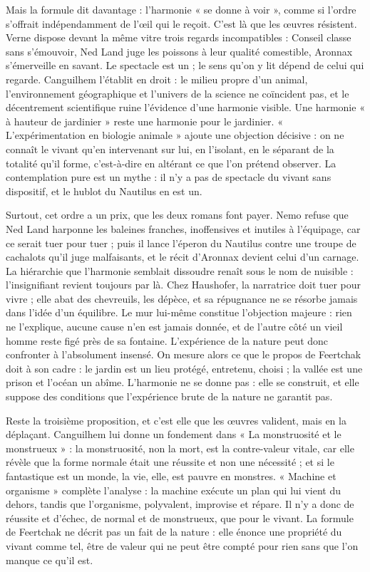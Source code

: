 \documentclass[11pt,a4paper]{article}
\begin{document}
Mais la formule dit davantage : l'harmonie « se donne à voir », comme si l'ordre s'offrait indépendamment de l'œil qui le reçoit. C'est là que les œuvres résistent. Verne dispose devant la même vitre trois regards incompatibles : Conseil classe sans s'émouvoir, Ned Land juge les poissons à leur qualité comestible, Aronnax s'émerveille en savant. Le spectacle est un ; le sens qu'on y lit dépend de celui qui regarde. Canguilhem l'établit en droit : le milieu propre d'un animal, l'environnement géographique et l'univers de la science ne coïncident pas, et le décentrement scientifique ruine l'évidence d'une harmonie visible. Une harmonie « à hauteur de jardinier » reste une harmonie pour le jardinier. « L'expérimentation en biologie animale » ajoute une objection décisive : on ne connaît le vivant qu'en intervenant sur lui, en l'isolant, en le séparant de la totalité qu'il forme, c'est-à-dire en altérant ce que l'on prétend observer. La contemplation pure est un mythe : il n'y a pas de spectacle du vivant sans dispositif, et le hublot du Nautilus en est un.

Surtout, cet ordre a un prix, que les deux romans font payer. Nemo refuse que Ned Land harponne les baleines franches, inoffensives et inutiles à l'équipage, car ce serait tuer pour tuer ; puis il lance l'éperon du Nautilus contre une troupe de cachalots qu'il juge malfaisants, et le récit d'Aronnax devient celui d'un carnage. La hiérarchie que l'harmonie semblait dissoudre renaît sous le nom de nuisible : l'insignifiant revient toujours par là. Chez Haushofer, la narratrice doit tuer pour vivre ; elle abat des chevreuils, les dépèce, et sa répugnance ne se résorbe jamais dans l'idée d'un équilibre. Le mur lui-même constitue l'objection majeure : rien ne l'explique, aucune cause n'en est jamais donnée, et de l'autre côté un vieil homme reste figé près de sa fontaine. L'expérience de la nature peut donc confronter à l'absolument insensé. On mesure alors ce que le propos de Feertchak doit à son cadre : le jardin est un lieu protégé, entretenu, choisi ; la vallée est une prison et l'océan un abîme. L'harmonie ne se donne pas : elle se construit, et elle suppose des conditions que l'expérience brute de la nature ne garantit pas.

Reste la troisième proposition, et c'est elle que les œuvres valident, mais en la déplaçant. Canguilhem lui donne un fondement dans « La monstruosité et le monstrueux » : la monstruosité, non la mort, est la contre-valeur vitale, car elle révèle que la forme normale était une réussite et non une nécessité ; et si le fantastique est un monde, la vie, elle, est pauvre en monstres. « Machine et organisme » complète l'analyse : la machine exécute un plan qui lui vient du dehors, tandis que l'organisme, polyvalent, improvise et répare. Il n'y a donc de réussite et d'échec, de normal et de monstrueux, que pour le vivant. La formule de Feertchak ne décrit pas un fait de la nature : elle énonce une propriété du vivant comme tel, être de valeur qui ne peut être compté pour rien sans que l'on manque ce qu'il est.
\end{document}
